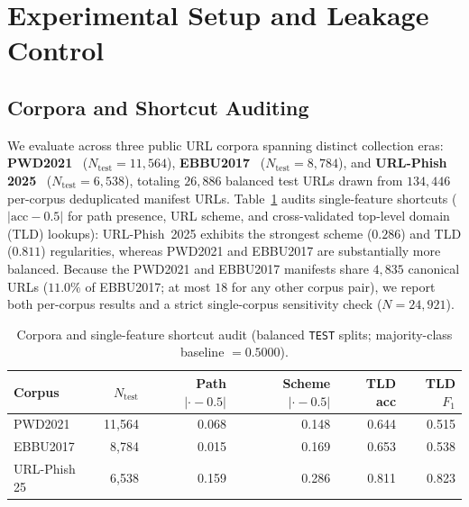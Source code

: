 \documentclass[conference,a4paper]{IEEEtran}
\begin{document}
\section{Experimental Setup and Leakage Control}
\label{sec:setup}
\subsection{Corpora and Shortcut Auditing}
We evaluate across three public URL corpora spanning distinct collection eras:
\textbf{PWD2021}~\cite{ariyadasa2021dataset} ($N_{\mathrm{test}}=11{,}564$),
\textbf{EBBU2017}~\cite{sahingoz2019} ($N_{\mathrm{test}}=8{,}784$), and
\textbf{URL-Phish 2025}~\cite{linh2025dataset} ($N_{\mathrm{test}}=6{,}538$),
totaling $26{,}886$ balanced test URLs drawn from
$134{,}446$ per-corpus deduplicated manifest URLs. Table~\ref{tab:corpora} audits single-feature shortcuts
($|\text{acc} - 0.5|$ for path presence, URL scheme, and cross-validated top-level
domain (TLD) lookups): URL-Phish~2025 exhibits the strongest scheme ($0.286$) and TLD ($0.811$)
regularities, whereas PWD2021 and EBBU2017 are substantially more balanced. Because
the PWD2021 and EBBU2017 manifests share $4{,}835$ canonical URLs ($11.0\%$ of
EBBU2017; at most $18$ for any other corpus pair), we report both per-corpus results
and a strict single-corpus sensitivity check ($N=24{,}921$).

\begin{table}[!t]
\caption{Corpora and single-feature shortcut audit (balanced {\upshape\texttt{TEST}}
splits; majority-class baseline $=0.5000$).}
\label{tab:corpora}
\centering
\scriptsize
\setlength{\tabcolsep}{3.0pt}
\begin{tabular}{lrrrrr}
\toprule
Corpus & $N_{\mathrm{test}}$ & Path $|{\cdot}{-}0.5|$ & Scheme $|{\cdot}{-}0.5|$
& TLD acc & TLD $F_1$ \\
\midrule
PWD2021      & 11{,}564 & 0.068 & 0.148 & 0.644 & 0.515 \\
EBBU2017     &  8{,}784 & 0.015 & 0.169 & 0.653 & 0.538 \\
URL-Phish 25 &  6{,}538 & 0.159 & 0.286 & 0.811 & 0.823 \\
\bottomrule
\end{tabular}
\end{table}
\end{document}
